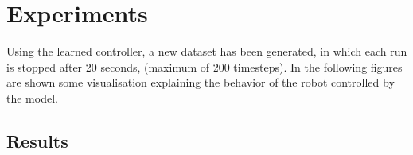 \section{Experiments}
Using the learned controller, a new dataset has been generated, in which each run is stopped after 20 seconds, (maximum 
of 200 timesteps). 
In the following figures are shown some visualisation explaining the behavior of the robot controlled by the model.

\subsection{Results}
%
%
%
%

